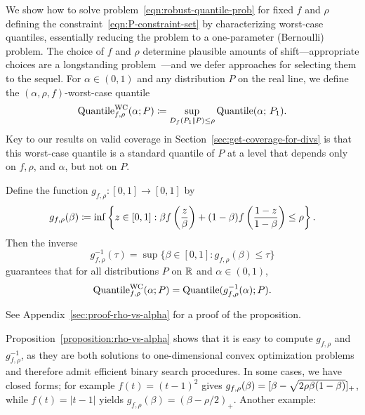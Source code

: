We show how to solve problem~\eqref{eqn:robust-quantile-prob} for fixed
$f$ and $\rho$ defining the constraint~\eqref{eqn:P-constraint-set} by
characterizing worst-case quantiles, essentially reducing the problem to
a one-parameter (Bernoulli) problem. The choice of $f$ and $\rho$ determine
plausible amounts of shift---appropriate choices are a longstanding
problem~\cite{DuchiNa21}---and we defer approaches for selecting them to the
sequel.
For $\alpha \in (0, 1)$ and any distribution $P$ on the real line,
we define the $(\alpha, \rho, f)$-worst-case quantile
\begin{equation}
  \label{eqn:wc-quantile}
  \textup{Quantile}^{\textup{WC}}_{f,\rho}(\alpha; P) \coloneqq 
  \sup_{D_{f}({P_1} |\!| {P}) \le \rho} \textup{Quantile}(\alpha; \, P_1).
\end{equation}
Key to our results on valid coverage in
Section~\ref{sec:get-coverage-for-divs} is that this worst-case quantile is
a standard quantile of $P$ at a  level that
depends only on $f, \rho$, and $\alpha$, but not on $P$.
\begin{proposition} 
  \label{proposition:rho-vs-alpha}
  Define the function $g_{f, \rho} : [0, 1] \to [0, 1]$ by
  \begin{equation*}
    g_{f,\rho}(\beta) \coloneqq \inf\left\{z \in [0, 1]
    : \beta f\left(\frac{z}{\beta}\right) + (1 - \beta) f\left(\frac{1 - z}{
      1 - \beta}\right) \le \rho \right\}.
  \end{equation*}
  Then the inverse
  \begin{equation*}
    g_{f,\rho}^{-1}(\tau) = \sup\{ \beta \in [0, 1] : g_{f,\rho}(\beta) \le \tau\}
  \end{equation*}
  guarantees that for all distributions $P$ on $\mathbb{R}$ and $\alpha \in (0, 1)$,
  \begin{align*}
    \textup{Quantile}^{\textup{WC}}_{f,\rho}(\alpha; P) =
    \textup{Quantile} (g_{f,\rho}^{-1}(\alpha); P ).
  \end{align*}
\end{proposition}
\noindent
See Appendix~\ref{sec:proof-rho-vs-alpha} for a proof of the proposition.

Proposition~\ref{proposition:rho-vs-alpha} shows that it is easy to compute
$g_{f,\rho}$ and $g_{f,\rho}^{-1}$, as they are both solutions to
one-dimensional convex optimization problems and therefore admit efficient
binary search procedures. In some cases, we have closed forms; for example
 $f(t) = (t - 1)^2$ gives $g_{f,\rho}(\beta) = [{\beta - \sqrt{2
    \rho \beta(1 - \beta)}}]_+$, while $f(t) = \left|t-1\right|$ yields $g_{f,\rho}(\beta) = (\beta - \rho/2)_+$.
Another example:

